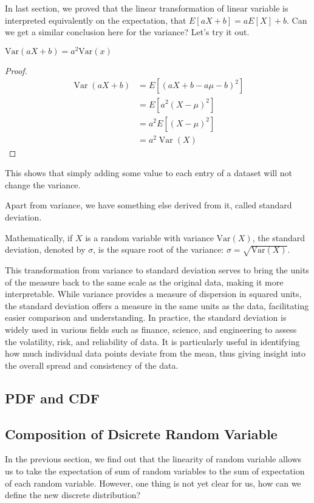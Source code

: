In last section, we proved that the linear transformation of linear variable is interpreted equivalently on the expectation, that $E[aX+b] = aE[X]+b$. Can we get a similar conclusion here for the variance? Let's try it out.

\begin{proposition}
    $\text{Var}(aX+b) = a^2\text{Var}(x)$
\end{proposition}
\begin{proof}
    $$\begin{aligned}\operatorname{Var}(a X+b) & =E\left[(a X+b-a \mu-b)^{2}\right] \\& =E\left[a^{2}(X-\mu)^{2}\right] \\& =a^{2} E\left[(X-\mu)^{2}\right] \\& =a^{2} \operatorname{Var}(X)\end{aligned}$$
\end{proof}

This shows that simply adding some value to each entry of a dataset will not change the variance. 

Apart from variance, we have something else derived from it, called standard deviation.
\begin{definition}
Mathematically, if \(X\) is a random variable with variance \(\text{Var}(X)\), the standard deviation, denoted by \(\sigma\), is the square root of the variance: \(\sigma = \sqrt{\text{Var}(X)}\). 
\end{definition}

This transformation from variance to standard deviation serves to bring the units of the measure back to the same scale as the original data, making it more interpretable. While variance provides a measure of dispersion in squared units, the standard deviation offers a measure in the same units as the data, facilitating easier comparison and understanding. In practice, the standard deviation is widely used in various fields such as finance, science, and engineering to assess the volatility, risk, and reliability of data. It is particularly useful in identifying how much individual data points deviate from the mean, thus giving insight into the overall spread and consistency of the data.

\subsection{PDF and CDF}

\subsection{Composition of Dsicrete Random Variable}
In the previous section, we find out that the linearity of random variable allows us to take the expectation of sum of random variables to the sum of expectation of each random variable. However, one thing is not yet clear for us, how can we define the new discrete distribution?

